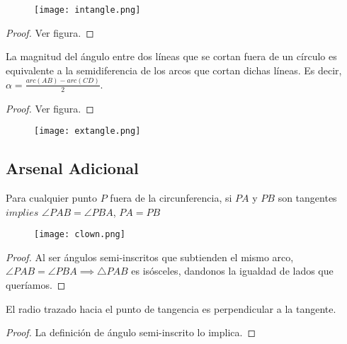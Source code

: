 \begin{figure}[h]
    \centering
    \texttt{[image: intangle.png]}
\end{figure}

\begin{proof}
    Ver figura.
\end{proof}

\begin{theorem}
    La magnitud del ángulo entre dos líneas que se cortan fuera
    de un círculo es equivalente a la semidiferencia de los arcos que 
    cortan dichas líneas. Es decir, 
    $\alpha = \frac{arc(AB)-arc(CD)}{2}.$
\end{theorem}
\begin{proof}
    Ver figura.
\end{proof}

\begin{figure}[h]
    \centering
    \texttt{[image: extangle.png]}
\end{figure}

\subsection{Arsenal Adicional}

\begin{lemma}
    Para cualquier punto $P$ fuera de la circunferencia, si 
    $PA$ y $PB$ son tangentes $implies$ $\angle PAB = \angle PBA$, 
    $PA = PB$
\end{lemma}

\begin{figure}[h]
    \centering
    \texttt{[image: clown.png]}
\end{figure}

\begin{proof}
    Al ser ángulos semi-inscritos que subtienden el mismo arco, 
    $\angle PAB = \angle PBA \implies \triangle PAB$ es isósceles, 
    dandonos la igualdad de lados que queríamos.
\end{proof}

\begin{lemma}
    El radio trazado hacia el punto de tangencia es perpendicular 
    a la tangente.
\end{lemma}

\begin{proof}
    La definición de ángulo semi-inscrito lo implica.
\end{proof}


